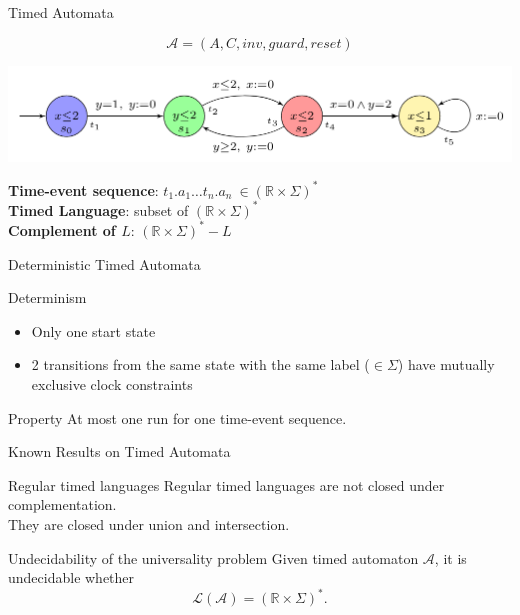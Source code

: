 \begin{frame}{Timed Automata}

  $$\mathcal{A}=(A,C,\mathit{inv},\mathit{guard},\mathit{reset})$$
  \vfill
  \begin{center}
    \includegraphics[scale=0.3]{timed.png}
  \end{center}
  \vfill
  \textbf{Time-event sequence}: $t_1.a_1\dots t_n.a_n~\in (\mathbb{R}\times\Sigma)^*$\\
  \textbf{Timed Language}: subset of $(\mathbb{R}\times\Sigma)^*$\\
  \textbf{Complement of $L$}: $(\mathbb{R}\times\Sigma)^* - L$
  
\end{frame}


\begin{frame}{Deterministic Timed Automata}

  \begin{block}{Determinism}
    \begin{itemize}
    \item Only one start state
    \item 2 transitions from the same state with the same label ($\in\Sigma$) have mutually exclusive clock constraints
    \end{itemize}
  \end{block}
  \vfill
  \begin{block}{Property}
    At most one run for one time-event sequence.
  \end{block}

\end{frame}


\begin{frame}{Known Results on Timed Automata}

  \begin{alertblock}{Regular timed languages}
    Regular timed languages are not closed under complementation.\\
    They are closed under union and intersection.
  \end{alertblock}
  \vfill
  \begin{alertblock}{Undecidability of the universality problem}
    Given timed automaton $\mathcal{A}$, it is undecidable whether $$\mathcal{L(A)}=(\mathbb{R}\times\Sigma)^*.$$
  \end{alertblock}
\end{frame}


